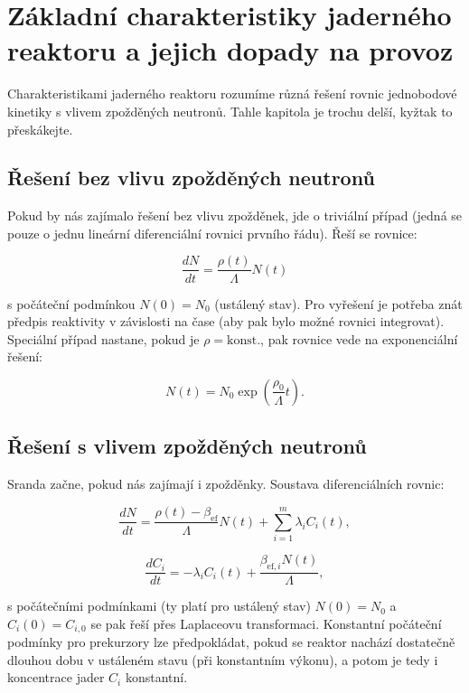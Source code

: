 \section{Základní charakteristiky jaderného reaktoru a jejich dopady na provoz}

Charakteristikami jaderného reaktoru rozumíme různá řešení rovnic jednobodové kinetiky s vlivem zpožděných neutronů. Tahle kapitola je trochu delší, kyžtak to přeskákejte.

\subsection{Řešení bez vlivu zpožděných neutronů}

Pokud by nás zajímalo řešení bez vlivu zpožděnek, jde o triviální případ (jedná se pouze o jednu lineární diferenciální rovnici prvního řádu). Řeší se rovnice:

$$ \dfrac{dN}{dt} = \dfrac{\rho (t)}{\Lambda} N(t) $$

s počáteční podmínkou $N(0) = N_0$ (ustálený stav). Pro vyřešení je potřeba znát předpis reaktivity v závislosti na čase (aby pak bylo možné rovnici integrovat). Speciální případ nastane, pokud je $\rho = \text{konst.}$, pak rovnice vede na exponenciální řešení:

\begin{equation}
  N(t) = N_0 \exp \left ( \dfrac{\rho_0}{\Lambda} t \right ).
\end{equation}

\subsection{Řešení s vlivem zpožděných neutronů}

Sranda začne, pokud nás zajímají i zpožděnky. Soustava diferenciálních rovnic:

$$ \dfrac{dN}{dt} = \dfrac{\rho(t) - \beta_{\text{ef}}}{\Lambda} N(t) + \sum_{i=1}^m \lambda_i C_i(t), $$

$$ \dfrac{dC_i}{dt} = -\lambda_i C_i(t) + \dfrac{\beta_{\text{ef},i}  N(t)}{\Lambda}, $$

s počátečními podmínkami (ty platí pro ustálený stav) $N(0) = N_0$ a $C_i(0) = C_{i,0}$ se pak řeší přes Laplaceovu transformaci. Konstantní počáteční podmínky pro prekurzory lze předpokládat, pokud se reaktor nachází dostatečně dlouhou dobu v ustáleném stavu (při konstantním výkonu), a potom je tedy i koncentrace jader $C_i$ konstantní.\\

